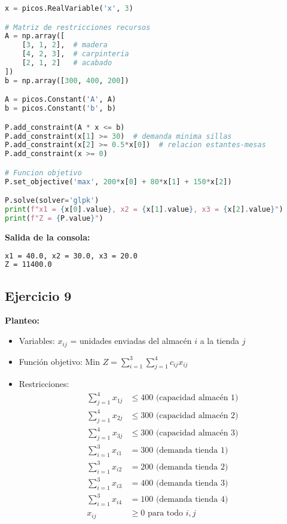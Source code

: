 \documentclass[12pt]{article}
\begin{document}
\begin{enumerate}
\begin{lstlisting}[language=Python]
x = picos.RealVariable('x', 3)

# Matriz de restricciones recursos
A = np.array([
    [3, 1, 2],  # madera
    [4, 2, 3],  # carpinteria
    [2, 1, 2]   # acabado
])
b = np.array([300, 400, 200])

A = picos.Constant('A', A)
b = picos.Constant('b', b)

P.add_constraint(A * x <= b)
P.add_constraint(x[1] >= 30)  # demanda minima sillas
P.add_constraint(x[2] >= 0.5*x[0])  # relacion estantes-mesas
P.add_constraint(x >= 0)

# Funcion objetivo
P.set_objective('max', 200*x[0] + 80*x[1] + 150*x[2])

P.solve(solver='glpk')
print(f"x1 = {x[0].value}, x2 = {x[1].value}, x3 = {x[2].value}")
print(f"Z = {P.value}")
\end{lstlisting}

\textbf{Salida de la consola:}
\begin{lstlisting}[language=bash,backgroundcolor=\color{black},basicstyle=\color{white}\ttfamily,numbers=none]
x1 = 40.0, x2 = 30.0, x3 = 20.0
Z = 11400.0
\end{lstlisting}

\subsection*{Ejercicio 9}

\textbf{Planteo:}
\begin{itemize}
\item Variables: $x_{ij}$ = unidades enviadas del almacén $i$ a la tienda $j$
\item Función objetivo: Min $Z = \sum_{i=1}^3 \sum_{j=1}^4 c_{ij}x_{ij}$
\item Restricciones:
  \begin{align*}
  \sum_{j=1}^4 x_{1j} &\leq 400 \text{ (capacidad almacén 1)} \\
  \sum_{j=1}^4 x_{2j} &\leq 300 \text{ (capacidad almacén 2)} \\
  \sum_{j=1}^4 x_{3j} &\leq 300 \text{ (capacidad almacén 3)} \\
  \sum_{i=1}^3 x_{i1} &= 300 \text{ (demanda tienda 1)} \\
  \sum_{i=1}^3 x_{i2} &= 200 \text{ (demanda tienda 2)} \\
  \sum_{i=1}^3 x_{i3} &= 400 \text{ (demanda tienda 3)} \\
  \sum_{i=1}^3 x_{i4} &= 100 \text{ (demanda tienda 4)} \\
  x_{ij} &\geq 0 \text{ para todo } i,j
  \end{align*}
\end{itemize}


\end{enumerate}
\end{document}
